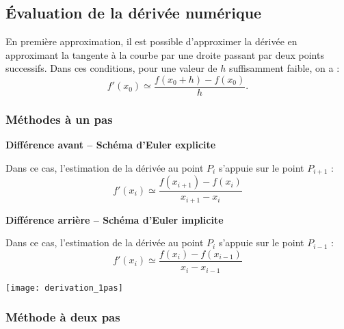 \subsection*{Évaluation de la dérivée numérique}

\begin{resultat}
En première approximation, il est possible d'approximer la dérivée en approximant la tangente à la courbe par une droite passant par deux points successifs. Dans ces conditions, pour une valeur de $h$ suffisamment faible, on a : 
$$
f'(x_0)\simeq \dfrac{f(x_0+h)-f(x_0)}{h}.
$$
\end{resultat}


%

\subsubsection{Méthodes à un pas}

\begin{minipage}[c]{.6\linewidth}
\begin{resultat}
\textbf{Différence avant -- Schéma d'Euler explicite}

Dans ce cas, l'estimation de la dérivée au point $P_i$ s'appuie sur le point $P_{i+1}$ :
$$
f'(x_i)\simeq\dfrac{f(x_{i+1})-f(x_i)}{x_{i+1}-x_i}
$$
\end{resultat}

\begin{resultat}
\textbf{Différence arrière -- Schéma d'Euler implicite}

Dans ce cas, l'estimation de la dérivée au point $P_i$ s'appuie sur le point $P_{i-1}$ :
$$
f'(x_i)\simeq\dfrac{f(x_{i})-f(x_{i-1})}{x_{i}-x_{i-1}}
$$
\end{resultat}
\end{minipage}\hfill
\begin{minipage}[c]{.35\linewidth}
\begin{center}
\texttt{[image: derivation\_1pas]}
\end{center}
\end{minipage}

\subsubsection{Méthode à deux pas}

